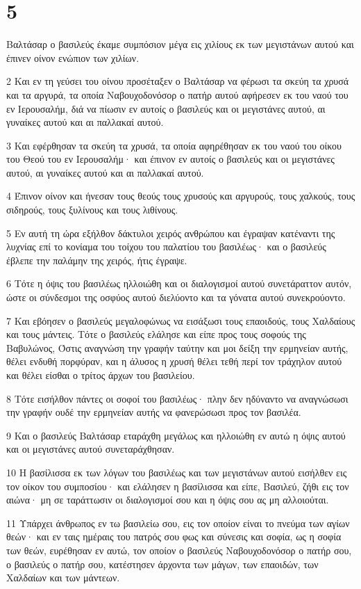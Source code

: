 \chapter{5}

\par Βαλτάσαρ ο βασιλεύς έκαμε συμπόσιον μέγα εις χιλίους εκ των μεγιστάνων αυτού και έπινεν οίνον ενώπιον των χιλίων.
\par 2 Και εν τη γεύσει του οίνου προσέταξεν ο Βαλτάσαρ να φέρωσι τα σκεύη τα χρυσά και τα αργυρά, τα οποία Ναβουχοδονόσορ ο πατήρ αυτού αφήρεσεν εκ του ναού του εν Ιερουσαλήμ, διά να πίωσιν εν αυτοίς ο βασιλεύς και οι μεγιστάνες αυτού, αι γυναίκες αυτού και αι παλλακαί αυτού.
\par 3 Και εφέρθησαν τα σκεύη τα χρυσά, τα οποία αφηρέθησαν εκ του ναού του οίκου του Θεού του εν Ιερουσαλήμ· και έπινον εν αυτοίς ο βασιλεύς και οι μεγιστάνες αυτού, αι γυναίκες αυτού και αι παλλακαί αυτού.
\par 4 Έπινον οίνον και ήνεσαν τους θεούς τους χρυσούς και αργυρούς, τους χαλκούς, τους σιδηρούς, τους ξυλίνους και τους λιθίνους.
\par 5 Εν αυτή τη ώρα εξήλθον δάκτυλοι χειρός ανθρώπου και έγραψαν κατέναντι της λυχνίας επί το κονίαμα του τοίχου του παλατίου του βασιλέως· και ο βασιλεύς έβλεπε την παλάμην της χειρός, ήτις έγραψε.
\par 6 Τότε η όψις του βασιλέως ηλλοιώθη και οι διαλογισμοί αυτού συνετάραττον αυτόν, ώστε οι σύνδεσμοι της οσφύος αυτού διελύοντο και τα γόνατα αυτού συνεκρούοντο.
\par 7 Και εβόησεν ο βασιλεύς μεγαλοφώνως να εισάξωσι τους επαοιδούς, τους Χαλδαίους και τους μάντεις. Τότε ο βασιλεύς ελάλησε και είπε προς τους σοφούς της Βαβυλώνος, Όστις αναγνώση την γραφήν ταύτην και μοι δείξη την ερμηνείαν αυτής, θέλει ενδυθή πορφύραν, και η άλυσος η χρυσή θέλει τεθή περί τον τράχηλον αυτού και θέλει είσθαι ο τρίτος άρχων του βασιλείου.
\par 8 Τότε εισήλθον πάντες οι σοφοί του βασιλέως· πλην δεν ηδύναντο να αναγνώσωσι την γραφήν ουδέ την ερμηνείαν αυτής να φανερώσωσι προς τον βασιλέα.
\par 9 Και ο βασιλεύς Βαλτάσαρ εταράχθη μεγάλως και ηλλοιώθη εν αυτώ η όψις αυτού και οι μεγιστάνες αυτού συνεταράχθησαν.
\par 10 Η βασίλισσα εκ των λόγων του βασιλέως και των μεγιστάνων αυτού εισήλθεν εις τον οίκον του συμποσίου· και ελάλησεν η βασίλισσα και είπε, Βασιλεύ, ζήθι εις τον αιώνα· μη σε ταράττωσιν οι διαλογισμοί σου και η όψις σου ας μη αλλοιούται.
\par 11 Υπάρχει άνθρωπος εν τω βασιλείω σου, εις τον οποίον είναι το πνεύμα των αγίων θεών· και εν ταις ημέραις του πατρός σου φως και σύνεσις και σοφία, ως η σοφία των θεών, ευρέθησαν εν αυτώ, τον οποίον ο βασιλεύς Ναβουχοδονόσορ ο πατήρ σου, ο βασιλεύς ο πατήρ σου, κατέστησεν άρχοντα των μάγων, των επαοιδών, των Χαλδαίων και των μάντεων.
